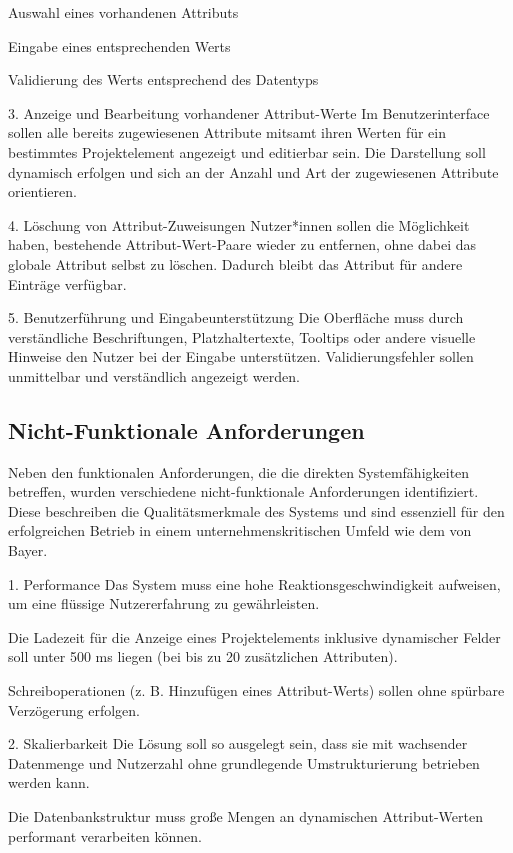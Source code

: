 Auswahl eines vorhandenen Attributs

Eingabe eines entsprechenden Werts

Validierung des Werts entsprechend des Datentyps

\large{3. Anzeige und Bearbeitung vorhandener Attribut-Werte}\break
Im Benutzerinterface sollen alle bereits zugewiesenen Attribute mitsamt ihren Werten für ein bestimmtes Projektelement angezeigt und editierbar sein. 
Die Darstellung soll dynamisch erfolgen und sich an der Anzahl und Art der zugewiesenen Attribute orientieren.

\large{4. Löschung von Attribut-Zuweisungen}\break
Nutzer*innen sollen die Möglichkeit haben, bestehende Attribut-Wert-Paare wieder zu entfernen, ohne dabei das globale Attribut selbst zu löschen. 
Dadurch bleibt das Attribut für andere Einträge verfügbar.

\large{5. Benutzerführung und Eingabeunterstützung}\break
Die Oberfläche muss durch verständliche Beschriftungen, Platzhaltertexte, Tooltips oder andere visuelle Hinweise den Nutzer bei der Eingabe unterstützen. 
Validierungsfehler sollen unmittelbar und verständlich angezeigt werden.
\subsection{Nicht-Funktionale Anforderungen}
Neben den funktionalen Anforderungen, die die direkten Systemfähigkeiten betreffen, wurden verschiedene nicht-funktionale Anforderungen identifiziert. Diese beschreiben die Qualitätsmerkmale des Systems und sind essenziell für den erfolgreichen Betrieb in einem unternehmenskritischen Umfeld wie dem von Bayer.

\large{1. Performance}\break
Das System muss eine hohe Reaktionsgeschwindigkeit aufweisen, um eine flüssige Nutzererfahrung zu gewährleisten.

Die Ladezeit für die Anzeige eines Projektelements inklusive dynamischer Felder soll unter 500 ms liegen (bei bis zu 20 zusätzlichen Attributen).

Schreiboperationen (z. B. Hinzufügen eines Attribut-Werts) sollen ohne spürbare Verzögerung erfolgen.

\large{2. Skalierbarkeit}\break
Die Lösung soll so ausgelegt sein, dass sie mit wachsender Datenmenge und Nutzerzahl ohne grundlegende Umstrukturierung betrieben werden kann.

Die Datenbankstruktur muss große Mengen an dynamischen Attribut-Werten performant verarbeiten können.

